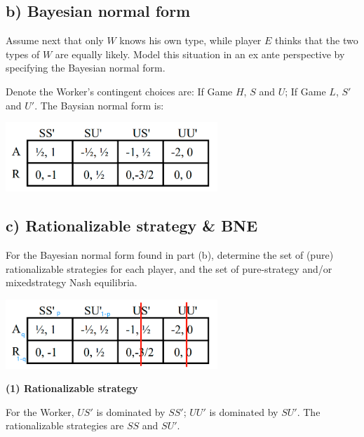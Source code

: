 \documentclass{article}
\begin{document}
\subsection*{b) Bayesian normal form} Assume next that only $W$ knows his own type, while player $E$ thinks that the two types
of $W$ are equally likely. Model this situation in an ex ante perspective by specifying
the Bayesian normal form.

\bigskip

Denote the Worker's contingent choices are: If Game $H$, $S$ and $U$; If Game $L$, $S'$ and $U'$. The Baysian normal form is:


\begin{center}
\includegraphics[width=0.6\textwidth]{12.q2_2}
\vspace{2mm}
\end{center}


\subsection*{c) Rationalizable strategy \& BNE} For the Bayesian normal form found in part (b), determine the set of (pure)
rationalizable strategies for each player, and the set of pure-strategy and/or mixedstrategy Nash equilibria.

\bigskip

\begin{center}
\includegraphics[width=0.6\textwidth]{12.q2_3}
\vspace{2mm}
\end{center}


\textbf{(1) Rationalizable strategy}

\medskip

For the Worker, $US'$ is dominated by $SS'$; $UU'$ is dominated by $SU'$. The rationalizable strategies are $SS$ and $SU'$.
\end{document}
